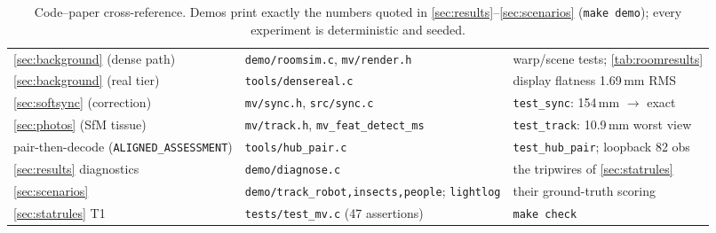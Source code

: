 \documentclass[11pt]{article}
\theoremstyle{definition}
\newcommand{\code}[1]{\texttt{#1}}
\begin{document}
\begin{table}[ht]
\begin{tabular}{l l l}
\autoref{sec:background} (dense path) & \code{demo/roomsim.c}, \code{mv/render.h} & warp/scene tests; \autoref{tab:roomresults} \\
\autoref{sec:background} (real tier) & \code{tools/densereal.c} & display flatness 1.69\,mm RMS \\
\autoref{sec:softsync} (correction) & \code{mv/sync.h}, \code{src/sync.c} & \code{test\_sync}: 154\,mm \(\to\) exact \\
\autoref{sec:photos} (SfM tissue) & \code{mv/track.h}, \code{mv\_feat\_detect\_ms} & \code{test\_track}: 10.9\,mm worst view \\
pair-then-decode (\code{ALIGNED\_ASSESSMENT}) & \code{tools/hub\_pair.c} & \code{test\_hub\_pair}; loopback 82 obs \\
\autoref{sec:results} diagnostics & \code{demo/diagnose.c} & the tripwires of \autoref{sec:statrules} \\
\autoref{sec:scenarios} & \code{demo/track\_robot,insects,people}; \code{lightlog} & their ground-truth scoring \\
\autoref{sec:statrules} T1 & \code{tests/test\_mv.c} (47 assertions) & \code{make check} \\
\bottomrule
\end{tabular}
\caption{Code--paper cross-reference. Demos print exactly the numbers
quoted in \autoref{sec:results}--\autoref{sec:scenarios}
(\code{make demo}); every experiment is deterministic and seeded.}
\label{tab:codemap}
\end{table}



\end{document}

